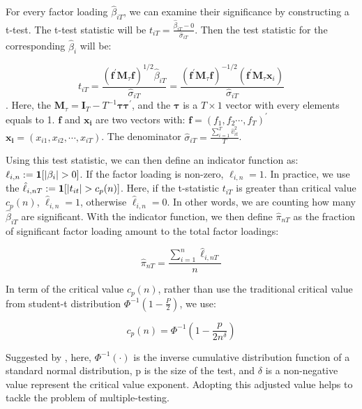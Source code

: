 For every factor loading $\hat{\beta}_{iT}$, we can examine their significance by constructing a t-test.
The t-test statistic will be $t_{iT} = \frac{\hat{\beta}_{iT} - 0}{\hat{\sigma}_{iT}}$.  
Then the test statistic for the corresponding $\hat{\beta}_i$ will be:

\[t_{i T}=\frac{\left(\mathbf{f}^{\prime} \mathbf{M}_{\tau} \mathbf{f}\right)^{1 / 2} \hat{\beta}_{i T}}{\hat{\sigma}_{i T}}=\frac{\left(\mathbf{f}^{\prime} \mathbf{M}_{\tau} \mathbf{f}\right)^{-1 / 2}\left(\mathbf{f}^{\prime} \mathbf{M}_{\tau} \mathbf{x}_{i}\right)}{\hat{\sigma}_{i T}} \tag{3} \label{test_statistic} \].
Here, the $\mathbf{M}_{\tau} = \mathbf{I}_T - T^{-1}\mathbf{\tau}\mathbf{\tau^\prime}$, and the $\mathbf{\tau}$ is a $T\times 1$ vector with every elements equals to 1.
$\mathbf{f}$ and $\mathbf{x_i}$ are two vectors with: $\mathbf{f} = (f_1, f_2 \cdots, f_T)^{\prime}$   $\mathbf{x_i} = (x_{i1}, x_{i2}, \cdots, x_{iT})$.
The denominator $\hat{\sigma}_{iT} = \frac{\sum_{i=1}^{T} \hat{v}^2_{it} }{T}$.

Using this test statistic, we can then define an indicator function as: $\ell_{i,n} := {\bf1}[|\beta_i|>0]$.
If the factor loading is non-zero, $\ell_{i,n} = 1$.
In practice, we use the $\hat{\ell}_{i,nT} := {\bf1}[|t_{it}|>c_p(n)]$.
Here, if the t-statistic $t_{iT}$ is greater than critical value $c_p(n)$,  $\hat{\ell}_{i,n} = 1$, otherwise $\hat{\ell}_{i,n} = 0$.
In other words, we are counting how many $\hat{\beta}_{iT}$ are significant.
With the indicator function, we then define $\hat{\pi}_{nT}$ as the fraction of significant factor loading amount to the total factor loadings:

\[  \hat{\pi}_{nT} = \frac{\sum_{i=1}^n \hat{\ell}_{i,nT}}{n} \tag{4} \label{pi_function} \]


In term of the critical value $c_p(n)$, rather than use the traditional critical value from student-t distribution $\Phi^{-1}(1-\frac{P}{2})$, we use:

\[   c_p(n) = \Phi^{-1}(1 - \frac{p}{2n^\delta})   \tag{5} \label{critical_value_function} \]

Suggested by , here, $\Phi^{-1}(\cdot)$ is the inverse cumulative distribution function of a standard normal distribution, p is the size of the test, and $\delta$ is a non-negative value represent the critical value exponent. 
Adopting this adjusted value helps to tackle the problem of multiple-testing.


